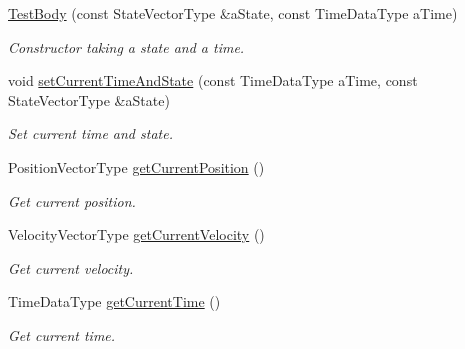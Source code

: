 \begin{DoxyCompactItemize}
\item 
\hyperlink{classtudat_1_1unit__tests_1_1TestBody_3_011_00_01DataType_01_4_a95a014bc3819b47d1926652a9277d9ab}{Test\+Body} (const State\+Vector\+Type \&a\+State, const Time\+Data\+Type a\+Time)
\begin{DoxyCompactList}\small\item\em Constructor taking a state and a time. \end{DoxyCompactList}\item 
void \hyperlink{classtudat_1_1unit__tests_1_1TestBody_3_011_00_01DataType_01_4_a753ada7a4c2170e4b15017b0e6fb602a}{set\+Current\+Time\+And\+State} (const Time\+Data\+Type a\+Time, const State\+Vector\+Type \&a\+State)
\begin{DoxyCompactList}\small\item\em Set current time and state. \end{DoxyCompactList}\item 
Position\+Vector\+Type \hyperlink{classtudat_1_1unit__tests_1_1TestBody_3_011_00_01DataType_01_4_a89f06a55b458b77d97d72358b2f3a712}{get\+Current\+Position} ()\hypertarget{classtudat_1_1unit__tests_1_1TestBody_3_011_00_01DataType_01_4_a89f06a55b458b77d97d72358b2f3a712}{}\label{classtudat_1_1unit__tests_1_1TestBody_3_011_00_01DataType_01_4_a89f06a55b458b77d97d72358b2f3a712}

\begin{DoxyCompactList}\small\item\em Get current position. \end{DoxyCompactList}\item 
Velocity\+Vector\+Type \hyperlink{classtudat_1_1unit__tests_1_1TestBody_3_011_00_01DataType_01_4_a267c87ccd9381474d7d4631cb64221a6}{get\+Current\+Velocity} ()\hypertarget{classtudat_1_1unit__tests_1_1TestBody_3_011_00_01DataType_01_4_a267c87ccd9381474d7d4631cb64221a6}{}\label{classtudat_1_1unit__tests_1_1TestBody_3_011_00_01DataType_01_4_a267c87ccd9381474d7d4631cb64221a6}

\begin{DoxyCompactList}\small\item\em Get current velocity. \end{DoxyCompactList}\item 
Time\+Data\+Type \hyperlink{classtudat_1_1unit__tests_1_1TestBody_3_011_00_01DataType_01_4_a8252b1d03a4e5fa46d903adb091f94c5}{get\+Current\+Time} ()\hypertarget{classtudat_1_1unit__tests_1_1TestBody_3_011_00_01DataType_01_4_a8252b1d03a4e5fa46d903adb091f94c5}{}\label{classtudat_1_1unit__tests_1_1TestBody_3_011_00_01DataType_01_4_a8252b1d03a4e5fa46d903adb091f94c5}

\begin{DoxyCompactList}\small\item\em Get current time. \end{DoxyCompactList}\end{DoxyCompactItemize}


